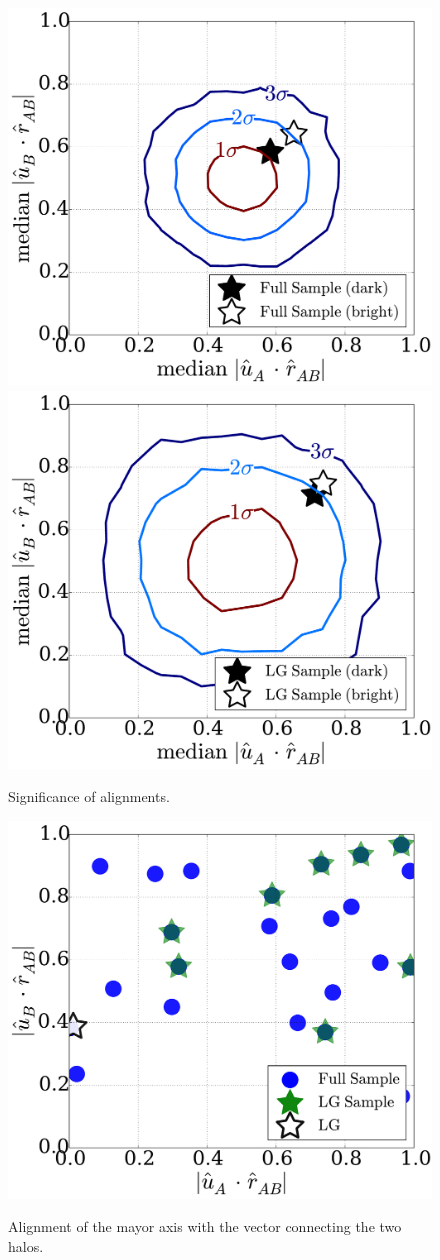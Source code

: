 \documentclass{emulateapj}
\begin{document}
\begin{figure}
\centering
\includegraphics[width=0.48\hsize]{significance_full_bright.pdf}
\includegraphics[width=0.48\hsize]{significance_lg_bright.pdf}
\caption{Significance of alignments.}
\label{fig:significance}
\end{figure}

\begin{figure}
\centering
\includegraphics[width=\hsize]{r_u_alignment.pdf}\\
\caption{Alignment of the mayor axis with the vector connecting the
  two halos.}
\label{fig:lg_alignment}
\end{figure}
\end{document}
